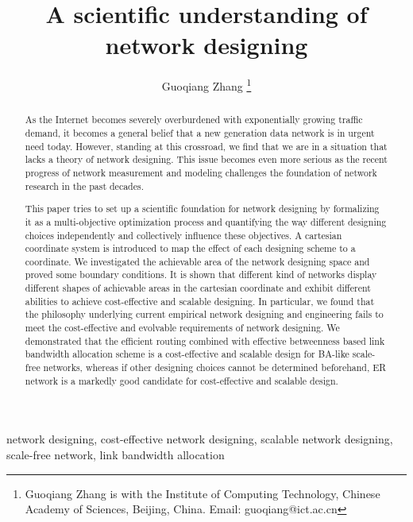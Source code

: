 \documentclass[journal]{IEEEtran}
\begin{document}
\title{A scientific understanding of network designing}
\author{Guoqiang Zhang
            \thanks{Guoqiang Zhang is with the Institute of Computing Technology, Chinese Academy of Sciences, Beijing, China. Email: guoqiang@ict.ac.cn}
            }
 \maketitle

 \begin{abstract}
As the Internet becomes severely overburdened with exponentially
growing traffic demand, it becomes a general belief that a new
generation data network is in urgent need today. However, standing
at this crossroad, we find that we are in a situation that lacks a
theory of network designing. This issue becomes even more serious as
the recent progress of network measurement and modeling challenges
the foundation of network research in the past decades.

This paper tries to set up a scientific foundation for network
designing  by formalizing it as a multi-objective optimization
process and quantifying the way different designing choices
independently and collectively influence these objectives. A
cartesian coordinate system is introduced to map the effect of each
designing scheme to a coordinate. We investigated the achievable
area of the network designing space and proved some boundary
conditions. It is shown that different kind of networks display
different shapes of achievable areas in the cartesian coordinate and
exhibit different abilities to achieve cost-effective and scalable
designing. In particular, we found that the philosophy underlying
current empirical network designing and engineering fails to meet
the cost-effective and evolvable requirements of network designing.
We demonstrated that the efficient routing combined with effective
betweenness based link bandwidth allocation scheme is a
cost-effective and scalable design for BA-like scale-free networks,
whereas if other designing choices cannot be determined beforehand,
ER network is a markedly good candidate for cost-effective and
scalable design.

 \end{abstract}

 \begin{IEEEkeywords}
network designing, cost-effective network designing, scalable
network designing, scale-free network, link bandwidth allocation
\end{IEEEkeywords}
\end{document}
